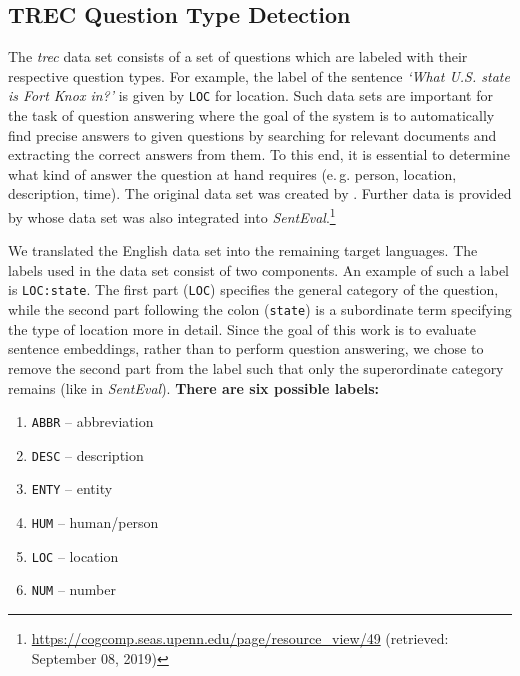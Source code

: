 \subsection{TREC Question Type Detection}
\label{sec:trec}

 The \textit{\gls{trec}} data set consists of a set of questions which are labeled with their respective question types. For example, the label of the sentence \textit{`What U.S. state is Fort Knox in?'} is given by \texttt{LOC} for location. Such data sets are important for the task of question answering where the goal of the system is to automatically find precise answers to given questions by searching for relevant documents and extracting the correct answers from them. To this end, it is essential to determine what kind of answer the question at hand requires (e.\,g. person, location, description, time). The original  data set was created by \citep{Voorhees.2000}. Further data is provided by \citep{Li.2002,Li.2005} whose data set was also integrated into \textit{SentEval}.\footnote{\url{https://cogcomp.seas.upenn.edu/page/resource_view/49} (retrieved: September 08, 2019)} 

 We translated the English data set into the remaining target languages. The labels used in the data set consist of two components. An example of such a label is \texttt{LOC:state}. The first part (\texttt{LOC}) specifies the general category of the question, while the second part following the colon (\texttt{state}) is a subordinate term specifying the type of location more in detail. Since the goal of this work is to evaluate sentence embeddings, rather than to perform question answering, we chose to remove the second part from the label such that only the superordinate category remains (like in \textit{SentEval}). \textbf{There are six possible labels:}

\begin{enumerate}[label=\color{tud9c}\textbf{\theenumi.}]\setlength\itemsep{-0.5em}
	\item \texttt{ABBR} -- abbreviation
	\item \texttt{DESC} -- description
	\item \texttt{ENTY} -- entity
	\item \texttt{HUM} -- human/person
	\item \texttt{LOC} -- location
	\item \texttt{NUM} -- number
\end{enumerate}


